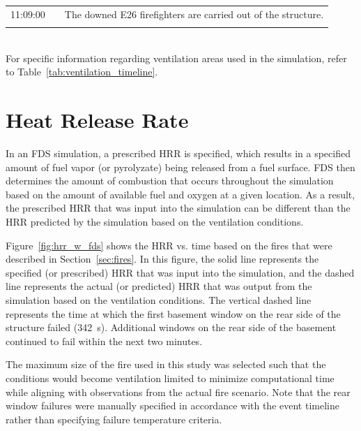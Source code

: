 \documentclass[12pt,oneside]{book}
\begin{document}
\begin{table}[!ht]
\begin{tabular}{ccl}
11:09:00       &              &  The downed E26 firefighters are carried out of the structure.       \\
               &              &                                                                      \\
\bottomrule
\end{tabular}
\footnotesize
\\ For specific information regarding ventilation areas used in the simulation, refer to Table~\ref{tab:ventilation_timeline}.
\normalsize
\label{tab:combined_timeline}
\end{table}


\clearpage


\section{Heat Release Rate}
\label{sec:HRR}

In an FDS simulation, a prescribed HRR is specified, which results in a specified amount of fuel vapor (or pyrolyzate) being released from a fuel surface. FDS then determines the amount of combustion that occurs throughout the simulation based on the amount of available fuel and oxygen at a given location. As a result, the prescribed HRR that was input into the simulation can be different than the HRR predicted by the simulation based on the ventilation conditions.

Figure~\ref{fig:hrr_w_fds} shows the HRR vs. time based on the fires that were described in Section~\ref{sec:fires}. In this figure, the solid line represents the specified (or prescribed) HRR that was input into the simulation, and the dashed line represents the actual (or predicted) HRR that was output from the simulation based on the ventilation conditions. The vertical dashed line represents the time at which the first basement window on the rear side of the structure failed (342~s). Additional windows on the rear side of the basement continued to fail within the next two minutes.

The maximum size of the fire used in this study was selected such that the conditions would become ventilation limited to minimize computational time while aligning with observations from the actual fire scenario. Note that the rear window failures were manually specified in accordance with the event timeline rather than specifying failure temperature criteria.
\end{document}
